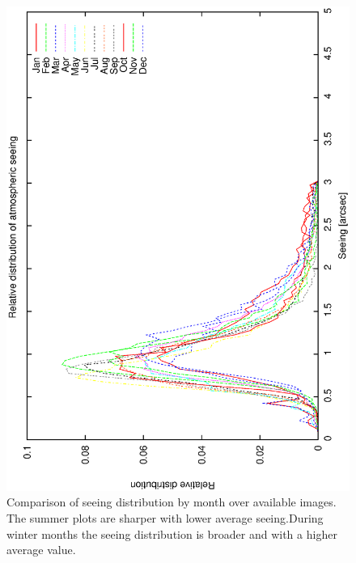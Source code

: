 {{\begin{figure}[htbp]
\begin{center}
    \includegraphics[scale=0.4, angle=-90]{figures/ecs/corr_see_dist_all.eps}
\end{center} 
\caption[Comparison of seeing distribution by month over available images.]
{Comparison of seeing distribution by month over available images. The summer plots are sharper with lower average seeing.During winter months the seeing distribution is broader and with a higher average value.}
\label{fig:see_dist_all}
\end{figure}


}}
